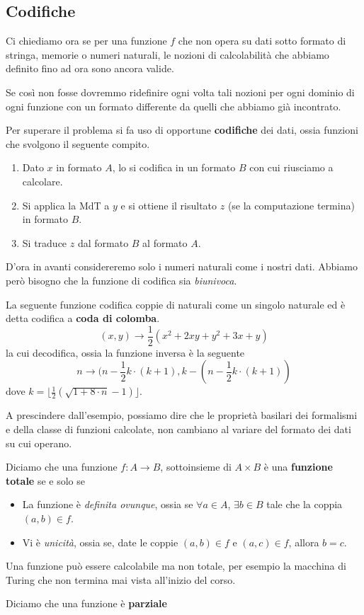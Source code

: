 \subsection{Codifiche}
Ci chiediamo ora se per una funzione $f$ che non opera su
dati sotto formato di stringa, memorie o numeri naturali,
le nozioni di calcolabilità che abbiamo definito fino ad ora
sono ancora valide.

Se così non fosse dovremmo ridefinire ogni volta tali nozioni
per ogni dominio di ogni funzione con un formato differente da
quelli che abbiamo già incontrato.

Per superare il problema si fa uso di opportune
\textbf{codifiche} dei dati, ossia funzioni che svolgono
il seguente compito.
\begin{enumerate}
	\item Dato $x$ in formato $A$, lo si codifica in un formato
	      $B$ con cui riusciamo a calcolare.
	\item Si applica la MdT a $y$ e si ottiene il risultato $z$
	      (se la computazione termina) in formato $B$.
	\item Si traduce $z$ dal formato $B$ al formato $A$.
\end{enumerate}
D'ora in avanti considereremo solo i numeri naturali come i
nostri dati. Abbiamo però bisogno che la funzione di codifica
sia \emph{biunivoca}.

\begin{example}
	La seguente funzione codifica coppie di naturali come un
	singolo naturale ed è detta codifica a
	\textbf{coda di colomba}.
	\[ (x, y) \to \frac{1}{2} (x^2 + 2 x y + y^2 + 3 x + y) \]
	la cui decodifica, ossia la funzione inversa è la seguente
	\[
		n \to (n - \frac{1}{2} k \cdot (k + 1),
		k - (n - \frac{1}{2} k \cdot (k + 1))
	\]
	dove $k=\lfloor \frac{1}{2}(\sqrt{1+8\cdot n}-1)\rfloor$.
\end{example}

A prescindere dall'esempio, possiamo dire che le proprietà
basilari dei formalismi e della classe di funzioni calcolate,
non cambiano al variare del formato dei dati su cui operano.

\begin{definition}
	Diciamo che una funzione $f : A \to B$, sottoinsieme di
	$A \times B$ è una \textbf{funzione totale} se e solo se
	\begin{itemize}
		\item La funzione è \emph{definita ovunque}, ossia se
		      $\forall a \in A$, $\exists b \in B$ tale che la
		      coppia $(a, b) \in f$.
		\item Vi è \emph{unicità}, ossia se, date le coppie
		      $(a, b) \in f$ e $(a, c) \in f$, allora $b=c$.
	\end{itemize}
\end{definition}

Una funzione può essere calcolabile ma non totale, per esempio
la macchina di Turing che non termina mai vista all'inizio del
corso.

\begin{definition}
	Diciamo che una funzione è \textbf{parziale}
\end{definition}

